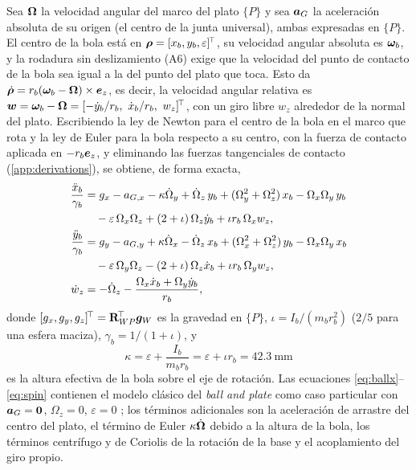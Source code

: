 Sea $\bm{\Omega}$ la velocidad angular del marco del plato $\{P\}$ y sea $\bm{a}_G$ la aceleración absoluta de su origen (el centro de la junta universal), ambas expresadas en $\{P\}$. El centro de la bola está en $\bm{\rho}=[x_b,y_b,\varepsilon]^{\!\top}$, su velocidad angular absoluta es $\bm{\omega}_b$, y la rodadura sin deslizamiento (A6) exige que la velocidad del punto de contacto de la bola sea igual a la del punto del plato que toca. Esto da $\dot{\bm{\rho}}=r_b(\bm{\omega}_b-\bm{\Omega})\times\bm{e}_z$, es decir, la velocidad angular relativa es $\vect w=\vect\omega_b-\vect\Omega=[-\dot y_b/r_b,\ \dot x_b/r_b,\ w_z]\T$, con un giro libre $w_z$ alrededor de la normal del plato. Escribiendo la ley de Newton para el centro de la bola en el marco que rota y la ley de Euler para la bola respecto a su centro, con la fuerza de contacto aplicada en $-r_b\bm{e}_z$, y eliminando las fuerzas tangenciales de contacto (\ref{app:derivations}), se obtiene, de forma exacta,
\begin{align}
  \frac{\ddot x_b}{\gamma_b}&=g_x-a_{G,x}-\kappa\dot\Omega_y+\dot\Omega_z\,y_b+(\Omega_y^2+\Omega_z^2)\,x_b-\Omega_x\Omega_y\,y_b \notag\\
   &\quad-\varepsilon\,\Omega_x\Omega_z+(2+\iota)\,\Omega_z\dot y_b+\iota r_b\,\Omega_xw_z, \label{eq:ballx}\\
  \frac{\ddot y_b}{\gamma_b}&=g_y-a_{G,y}+\kappa\dot\Omega_x-\dot\Omega_z\,x_b+(\Omega_x^2+\Omega_z^2)\,y_b-\Omega_x\Omega_y\,x_b \notag\\
   &\quad-\varepsilon\,\Omega_y\Omega_z-(2+\iota)\,\Omega_z\dot x_b+\iota r_b\,\Omega_yw_z, \label{eq:bally}\\
  \dot w_z&=-\dot\Omega_z-\frac{\Omega_x\dot x_b+\Omega_y\dot y_b}{r_b}, \label{eq:spin}
\end{align}
donde $[g_x,g_y,g_z]^{\!\top}=\mathbf{R}_{WP}^{\!\top}\bm{g}_W$ es la gravedad en $\{P\}$, $\iota=I_b/(m_br_b^2)$ ($2/5$ para una esfera maciza), $\gamma_b=1/(1+\iota)$, y
\begin{equation}
  \kappa=\varepsilon+\frac{I_b}{m_br_b}=\varepsilon+\iota r_b=\SI{42.3}{\milli\metre}
  \label{eq:kappa}
\end{equation}
es la altura efectiva de la bola sobre el eje de rotación. Las ecuaciones \eqref{eq:ballx}--\eqref{eq:spin} contienen el modelo clásico del \textit{ball and plate} como caso particular con $\bm{a}_G=\bm{0}$, $\Omega_z=0$, $\varepsilon=0$ \cite{awtar2002,hauser1992}; los términos adicionales son la aceleración de arrastre del centro del plato, el término de Euler $\kappa\dot{\bm{\Omega}}$ debido a la altura de la bola, los términos centrífugo y de Coriolis de la rotación de la base y el acoplamiento del giro propio.

